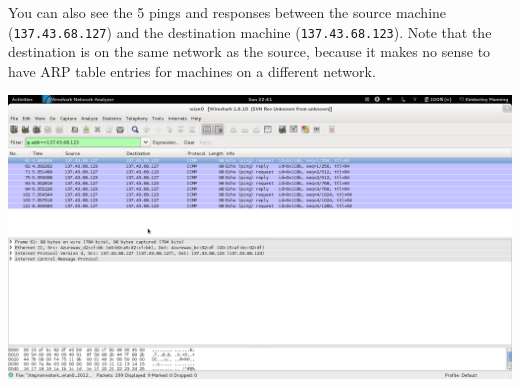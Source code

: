 \documentclass[a4paper,12pt]{report}
\begin{document}
You can also see the 5 pings and responses between the source machine (\verb=137.43.68.127=) and the destination machine (\verb=137.43.68.123=). Note that the destination is on the same network as the source, because it makes no sense to have ARP table entries for machines on a different network.

\includegraphics[width=\textwidth]{search.png}
\end{document}
